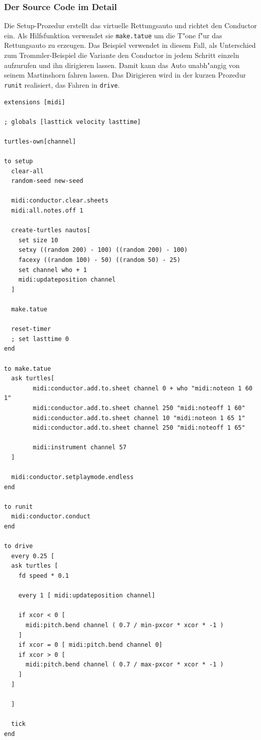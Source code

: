 \subsubsection{Der Source Code im Detail}
Die Setup-Prozedur erstellt das virtuelle Rettungsauto und richtet den Conductor
ein. Als Hilfsfunktion verwendet sie \lstinline|make.tatue| um die T"one f"ur
das Rettungsauto zu erzeugen. Das Beispiel verwendet in diesem Fall, als 
Unterschied zum Trommler-Beispiel die Variante den Conductor in jedem Schritt
einzeln aufzurufen und ihn dirigieren lassen. Damit kann das Auto unabh"angig von
seinem Martinshorn fahren lassen. Das Dirigieren wird in der kurzen Prozedur \lstinline|runit|
realisiert, das Fahren in \lstinline|drive|.

\begin{lstlisting}[language=Logo]
extensions [midi]

; globals [lasttick velocity lasttime]

turtles-own[channel]

to setup
  clear-all
  random-seed new-seed
  
  midi:conductor.clear.sheets
  midi:all.notes.off 1
  
  create-turtles nautos[
    set size 10
    setxy ((random 200) - 100) ((random 200) - 100)
    facexy ((random 100) - 50) ((random 50) - 25)
    set channel who + 1
    midi:updateposition channel
  ]
  
  make.tatue
    
  reset-timer
  ; set lasttime 0
end

to make.tatue
  ask turtles[
		midi:conductor.add.to.sheet channel 0 + who "midi:noteon 1 60 1"
		midi:conductor.add.to.sheet channel 250 "midi:noteoff 1 60"
		midi:conductor.add.to.sheet channel 10 "midi:noteon 1 65 1"
		midi:conductor.add.to.sheet channel 250 "midi:noteoff 1 65"
		
		midi:instrument channel 57
  ]
  
  midi:conductor.setplaymode.endless
end

to runit
  midi:conductor.conduct
end

to drive
  every 0.25 [
  ask turtles [
    fd speed * 0.1
    
    every 1 [ midi:updateposition channel]
    
    if xcor < 0 [
      midi:pitch.bend channel ( 0.7 / min-pxcor * xcor * -1 )
    ]
    if xcor = 0 [ midi:pitch.bend channel 0]
    if xcor > 0 [
      midi:pitch.bend channel ( 0.7 / max-pxcor * xcor * -1 )
    ]
  ]
  
  ]
  
  tick  
end
\end{lstlisting}


